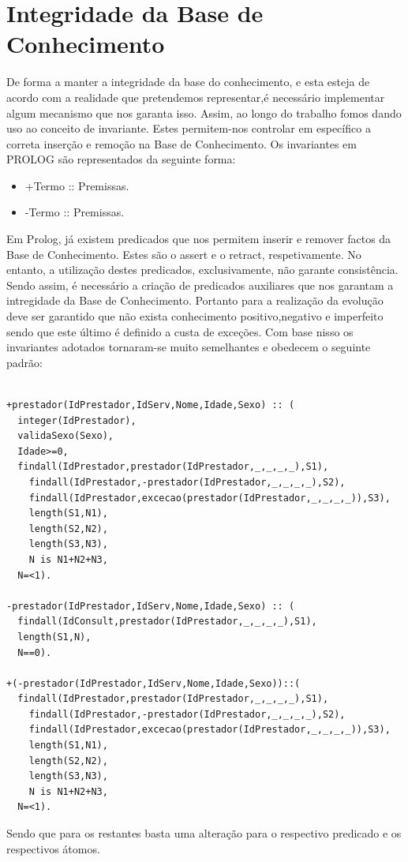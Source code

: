 \documentclass[25pt]{article}
\begin{document}
\section{Integridade da Base de Conhecimento}
De forma a manter a integridade da base do conhecimento, e esta esteja de acordo com a realidade que pretendemos representar,é necessário implementar
algum mecanismo que nos garanta isso. Assim, ao longo do trabalho fomos dando uso ao conceito de invariante. Estes permitem-nos controlar em específico a
correta inserção e remoção na Base de Conhecimento. Os invariantes em PROLOG são representados da seguinte forma:
\begin{itemize}
\item +Termo :: Premissas.
\item -Termo :: Premissas.
\end{itemize}
Em Prolog, já existem predicados que nos permitem inserir e remover factos da Base de Conhecimento. Estes são o assert e o retract, respetivamente. No entanto, a utilização destes predicados, exclusivamente, não garante consistência. Sendo assim, é necessário a criação de predicados auxiliares que nos garantam a intregidade da Base de Conhecimento.
Portanto para a realização da evolução deve ser garantido que não exista conhecimento positivo,negativo e imperfeito sendo que este último é definido a custa de exceções. Com base nisso os invariantes adotados tornaram-se muito semelhantes e obedecem o seguinte padrão:
\begin{lstlisting}

+prestador(IdPrestador,IdServ,Nome,Idade,Sexo) :: (
  integer(IdPrestador),
  validaSexo(Sexo),
  Idade>=0,
  findall(IdPrestador,prestador(IdPrestador,_,_,_,_),S1),
    findall(IdPrestador,-prestador(IdPrestador,_,_,_,_),S2),
    findall(IdPrestador,excecao(prestador(IdPrestador,_,_,_,_)),S3),
    length(S1,N1),
    length(S2,N2),
    length(S3,N3),
    N is N1+N2+N3,
  N=<1).

-prestador(IdPrestador,IdServ,Nome,Idade,Sexo) :: (
  findall(IdConsult,prestador(IdPrestador,_,_,_,_),S1),
  length(S1,N),
  N==0).

+(-prestador(IdPrestador,IdServ,Nome,Idade,Sexo))::(
  findall(IdPrestador,prestador(IdPrestador,_,_,_,_),S1),
    findall(IdPrestador,-prestador(IdPrestador,_,_,_,_),S2),
    findall(IdPrestador,excecao(prestador(IdPrestador,_,_,_,_)),S3),
    length(S1,N1),
    length(S2,N2),
    length(S3,N3),
    N is N1+N2+N3,
  N=<1).

\end{lstlisting}
Sendo que para os restantes basta uma alteração para o respectivo predicado e os respectivos átomos.
\end{document}
